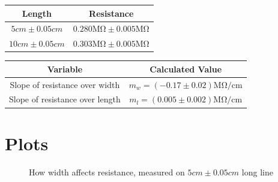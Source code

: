 \documentclass[12pt]{article}
\begin{document}
\begin{center}
    \begin{tabular}{|c|c|}
        \hline
        \textbf{Length} & \textbf{Resistance} \\
        \hline \hline
        $5\si{cm} \pm 0.05\si{cm}$ & $0.280\si{\mega\ohm} \pm 0.005\si{\mega\ohm}$ \\
        \hline
        $10\si{cm} \pm 0.05\si{cm}$ & $0.303\si{\mega\ohm} \pm 0.005\si{\mega\ohm}$ \\
        \hline
    \end{tabular}
\end{center}

\begin{center}
    \begin{tabular}{|c|c|}
        \hline
        \textbf{Variable} & \textbf{Calculated Value} \\
        \hline \hline
        Slope of resistance over width & $m_w = (-0.17 \pm 0.02) \si{\mega\ohm\per\cm}$ \\
        \hline
        Slope of resistance over length & $m_l = (0.005 \pm 0.002) \si{\mega\ohm\per\cm}$ \\
        \hline
    \end{tabular}
\end{center}

\section{Plots}

\begin{figure}[H]
    \centering
    \caption{How width affects resistance, measured on $5\si{cm} \pm 0.05\si{cm}$ long line}
    \label{plot:width}
\end{figure}
\end{document}
